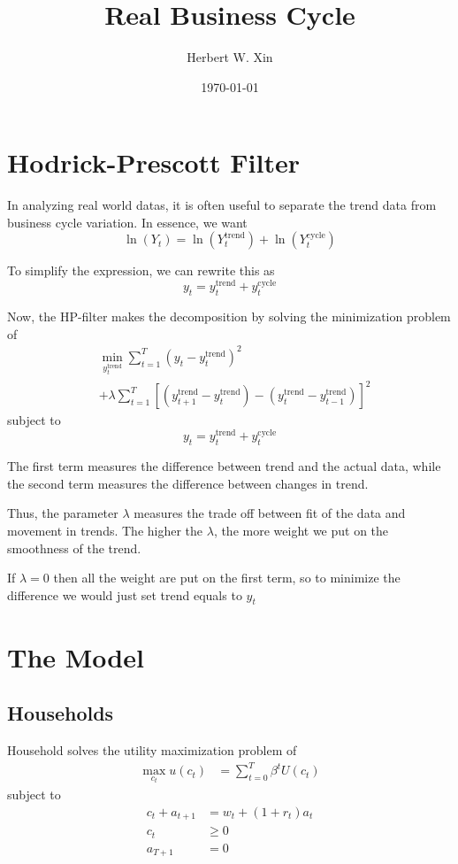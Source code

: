 \documentclass[twocolumn, fleqn]{article}
\begin{document}
	\title{Real Business Cycle}
	\author{Herbert W. Xin}
	\date{\today}
	\maketitle

	\tableofcontents
	\thispagestyle{fancy}
	
	\section{Hodrick-Prescott Filter}
	
	In analyzing real world datas, it is often useful to separate the trend data from business cycle variation. In essence, we want 
	\[\ln(Y_t) = \ln (Y_t^{\text{trend}})+\ln (Y_t^{\text{cycle}})\]
	
	To simplify the expression, we can rewrite this as 
	\[y_t = y_t^{\text{trend}}+y_t^\text{cycle}\]
	
	Now, the HP-filter makes the decomposition by solving the minimization problem of 
	\begin{align*}
		&\min_{y_t^{\text{trend}}}\sum_{t=1}^{T} (y_t-y_t^{\text{trend}})^2 \\
		&+\lambda \sum_{t=1}^{T} \left[ (y_{t+1}^{\text{trend}}- y_{t}^{\text{trend}})-(y_{t}^{\text{trend}}-y_{t-1}^{\text{trend}})\right]^2
	\end{align*}
	subject to 
	\[y_t = y_t^{\text{trend}}+y_t^\text{cycle}\]
	
	The first term measures the difference between trend and the actual data, while the second term measures the difference between changes in trend.
	
	Thus, the parameter $\lambda$ measures the trade off between fit of the data and movement in trends. The higher the $\lambda$, the more weight we put on the smoothness of the trend. 
	
	If $\lambda=0$ then all the weight are put on the first term, so to minimize the difference we would just set trend equals to $y_t$
	
	\section{The Model}
	\subsection{Households}
	Household solves the utility maximization problem of 
	\begin{align*}
		\max_{c_t} u(c_t) &= \sum_{t=0}^{T} \beta^t U(c_t)
	\end{align*}
	subject to 
	\begin{align*}
	c_t + a_{t+1} &= w_t + (1 + r_t) a_t \\
	c_t &\geq 0 \\
	a_{T+1} &= 0
	\end{align*}
	
\end{document}
